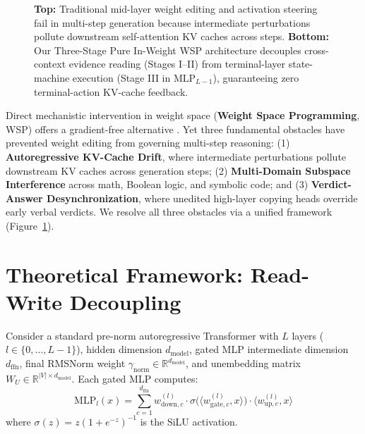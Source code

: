 \documentclass[10pt,twocolumn]{article}
\begin{document}
\begin{figure}[t]
{%
}
\caption{\textbf{Top:} Traditional mid-layer weight editing and activation steering fail in multi-step generation because intermediate perturbations pollute downstream self-attention KV caches across steps. \textbf{Bottom:} Our Three-Stage Pure In-Weight WSP architecture decouples cross-context evidence reading (Stages I--II) from terminal-layer state-machine execution (Stage III in $\mathrm{MLP}_{L-1}$), guaranteeing zero terminal-action KV-cache feedback.}
\label{fig:architecture}
\end{figure}

Direct mechanistic intervention in weight space (\textbf{Weight Space Programming}, WSP) offers a gradient-free alternative \cite{rome2022,memit2023,repe2023}. Yet three fundamental obstacles have prevented weight editing from governing multi-step reasoning: (1) \textbf{Autoregressive KV-Cache Drift}, where intermediate perturbations pollute downstream KV caches across generation steps; (2) \textbf{Multi-Domain Subspace Interference} across math, Boolean logic, and symbolic code; and (3) \textbf{Verdict-Answer Desynchronization}, where unedited high-layer copying heads override early verbal verdicts. We resolve all three obstacles via a unified framework (Figure~\ref{fig:architecture}).

\section{Theoretical Framework: Read-Write Decoupling}

Consider a standard pre-norm autoregressive Transformer with $L$ layers ($l \in \{0, \dots, L-1\}$), hidden dimension $d_{\mathrm{model}}$, gated MLP intermediate dimension $d_{\mathrm{ffn}}$, final RMSNorm weight $\gamma_{\mathrm{norm}} \in \mathbb{R}^{d_{\mathrm{model}}}$, and unembedding matrix $W_U \in \mathbb{R}^{|V| \times d_{\mathrm{model}}}$. Each gated MLP computes:
\begin{equation}
\mathrm{MLP}_l(x) = \sum_{c=1}^{d_{\mathrm{ffn}}} w_{\mathrm{down}, c}^{(l)} \cdot \sigma\big(\langle w_{\mathrm{gate}, c}^{(l)}, x \rangle\big) \cdot \langle w_{\mathrm{up}, c}^{(l)}, x \rangle
\end{equation}
where $\sigma(z) = z(1 + e^{-z})^{-1}$ is the SiLU activation.
\end{document}

